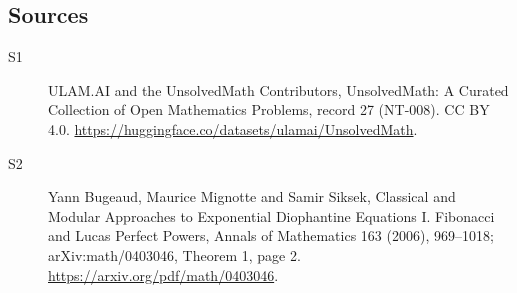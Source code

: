 \documentclass[11pt]{article}
\begin{document}
\subsection{Sources}
\begin{description}
\item[\hypertarget{source:27:1}{S1}] ULAM.AI and the UnsolvedMath Contributors, UnsolvedMath: A Curated Collection of Open Mathematics Problems, record 27 (NT-008). CC BY 4.0. \url{https://huggingface.co/datasets/ulamai/UnsolvedMath}.
\item[\hypertarget{source:27:2}{S2}] Yann Bugeaud, Maurice Mignotte and Samir Siksek, Classical and Modular Approaches to Exponential Diophantine Equations I. Fibonacci and Lucas Perfect Powers, Annals of Mathematics 163 (2006), 969--1018; arXiv:math/0403046, Theorem 1, page 2. \url{https://arxiv.org/pdf/math/0403046}.
\end{description}
\label{end:27}
\end{document}
